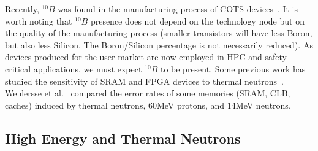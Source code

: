 Recently, $^{10}B$ was found in the manufacturing process of COTS devices~\cite{wen2010b10}. It is worth noting that $^{10}B$ presence does not depend on the technology node but on the quality of the manufacturing process (smaller transistors will have less Boron, but also less Silicon. The Boron/Silicon percentage is not necessarily reduced). As devices produced for the user market are now employed in HPC and safety-critical applications, we must expect $^{10}B$ to be present. 
Some previous work has studied the sensitivity of SRAM and FPGA devices to thermal neutrons~\cite{lee2015radiation,fang2016characterization,maillard2015neutron}. Weulersse et al.~\cite{weulersse2018contribution} compared the error rates of some memories (SRAM, CLB, caches) induced by thermal neutrons, 60MeV protons, and 14MeV neutrons. %


\subsection{High Energy and Thermal Neutrons}
\label{sec_environment}


